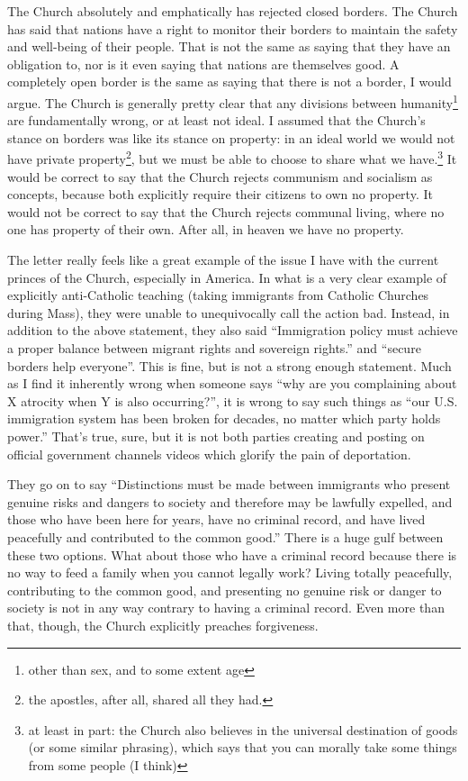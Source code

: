 \documentclass[12pt]{article}
\newcommand{\say}[1]{``#1''}
\renewcommand{\,}{\textsuperscript{,}}
\begin{document}
The Church absolutely and emphatically has rejected closed borders.  
The Church has said that nations have a right to monitor their borders to maintain the safety and well-being of their people.  
That is not the same as saying that they have an obligation to, nor is it even saying that nations are themselves good.  
A completely open border is the same as saying that there is not a border, I would argue.  
The Church is generally pretty clear that any divisions between humanity\footnote{other than sex, and to some extent age} are fundamentally wrong, or at least not ideal.  
I assumed that the Church's stance on borders was like its stance on property: in an ideal world we would not have private property\footnote{the apostles, after all, shared all they had.}, but we must be able to choose to share what we have.\footnote{at least in part: the Church also believes in the universal destination of goods (or some similar phrasing), which says that you can morally take some things from some people (I think)}  
It would be correct to say that the Church rejects communism and socialism as concepts, because both explicitly require their citizens to own no property.  
It would not be correct to say that the Church rejects communal living, where no one has property of their own.  
After all, in heaven we have no property.

The letter really feels like a great example of the issue I have with the current princes of the Church, especially in America.  
In what is a very clear example of explicitly anti-Catholic teaching (taking immigrants from Catholic Churches during Mass), they were unable to unequivocally call the action bad.  
Instead, in addition to the above statement, they also said \say{Immigration policy must achieve a proper balance between migrant rights and sovereign rights.} and \say{secure borders help everyone}.  
This is fine, but is not a strong enough statement.  
Much as I find it inherently wrong when someone says \say{why are you complaining about X atrocity when Y is also occurring?}, it is wrong to say such things as \say{our U.S. immigration system has been broken for decades, no matter which party holds power.}  
That's true, sure, but it is not both parties creating and posting on official government channels videos which glorify the pain of deportation.

They go on to say \say{Distinctions must be made between immigrants who present genuine risks
and dangers to society and therefore may be lawfully expelled, and those
who have been here for years, have no criminal record, and have lived
peacefully and contributed to the common good.}  
There is a huge gulf between these two options.  
What about those who have a criminal record because there is no way to feed a family when you cannot legally work?  
Living totally peacefully, contributing to the common good, and presenting no genuine risk or danger to society is not in any way contrary to having a criminal record.  
Even more than that, though, the Church explicitly preaches forgiveness.
\end{document}
